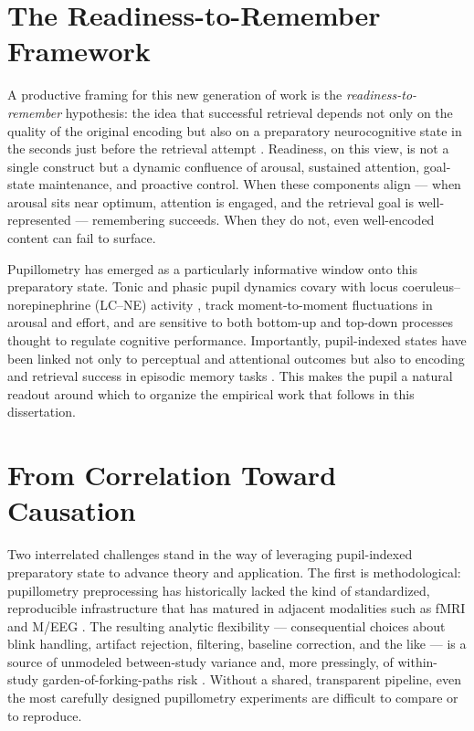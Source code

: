 \section{The Readiness-to-Remember Framework}

A productive framing for this new generation of work is the \textit{readiness-to-remember} hypothesis: the idea that successful retrieval depends not only on the quality of the original encoding but also on a preparatory neurocognitive state in the seconds just before the retrieval attempt \parencite{madore2022readiness}. Readiness, on this view, is not a single construct but a dynamic confluence of arousal, sustained attention, goal-state maintenance, and proactive control. When these components align --- when arousal sits near optimum, attention is engaged, and the retrieval goal is well-represented --- remembering succeeds. When they do not, even well-encoded content can fail to surface.

Pupillometry has emerged as a particularly informative window onto this preparatory state. Tonic and phasic pupil dynamics covary with locus coeruleus--norepinephrine (LC--NE) activity \parencite{joshi2016relationships,joshi2020pupil}, track moment-to-moment fluctuations in arousal and effort, and are sensitive to both bottom-up and top-down processes thought to regulate cognitive performance. Importantly, pupil-indexed states have been linked not only to perceptual and attentional outcomes but also to encoding and retrieval success in episodic memory tasks \parencite{madore2020memory,robison2022pupillary,unsworth2017importance}. This makes the pupil a natural readout around which to organize the empirical work that follows in this dissertation.

\section{From Correlation Toward Causation}

Two interrelated challenges stand in the way of leveraging pupil-indexed preparatory state to advance theory and application. The first is methodological: pupillometry preprocessing has historically lacked the kind of standardized, reproducible infrastructure that has matured in adjacent modalities such as fMRI and M/EEG \parencite{esteban2019fmriprep,delorme2004eeglab,gramfort2013meg}. The resulting analytic flexibility --- consequential choices about blink handling, artifact rejection, filtering, baseline correction, and the like --- is a source of unmodeled between-study variance and, more pressingly, of within-study garden-of-forking-paths risk \parencite{gelman2013garden,simmons2011false}. Without a shared, transparent pipeline, even the most carefully designed pupillometry experiments are difficult to compare or to reproduce.


